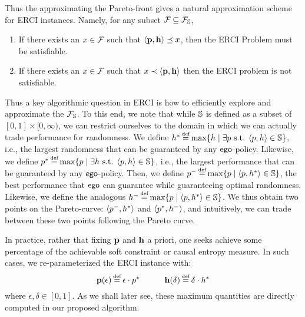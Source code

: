 \noindent
Thus the approximating the Pareto-front gives a natural approximation
scheme for ERCI instances. Namely, for any subset $\mathcal{F}_{} \subseteq
\mathcal{F}_{\mathbb{S}}$,
\begin{enumerate}
\item If there exists an $x \in \mathcal{F}_{}$ such that
$\langle \mathbf{p}, \mathbf{h} \rangle \preceq x$, then the ERCI
Problem must be satisfiable.
\item If there exists an $x \in \mathcal{F}_{}$
such that $x \prec \langle \mathbf{p}, \mathbf{h} \rangle$ then the
ERCI problem is not satisfiable.
\end{enumerate}

\begin{example}
	
\end{example}

Thus a key algorithmic question in ERCI is how to efficiently explore
and approximate the $\mathcal{F}_{\mathbb{S}}$.  
To this end, we note that while $\mathbb{S}$ is defined as a subset of $[0,1] \times [0,\infty)$, we can restrict ourselves to the domain in which we can actually trade performance for randomness. 
We define 
$\rndopt \eqdef \max \{ \rndp \mid \exists \scp \text{ s.t. } \langle \scp, \rndp \rangle \in \solutions  \} $, i.e., the largest randomness that can be guaranteed by any $\mathsf{ego}$-policy. 
Likewise, we define 
$\scopt \eqdef \max \{ \scp \mid \exists \rndp \text{ s.t. } \langle \scp, \rndp \rangle \in \solutions  \} $, i.e., the largest performance that can be guaranteed by any $\mathsf{ego}$-policy. 
Then, we define 
$\scmin \eqdef \max \{ \scp \mid \langle \scp, \rndopt \rangle  \in \solutions \}$, the best performance that $\mathsf{ego}$ can guarantee while guaranteeing optimal randomness. 
Likewise, we define  the analogous $\rndmin \eqdef \max \{ \scp \mid \langle \scp, \rndopt \rangle  \in \solutions \}$.
We thus obtain two points on the Pareto-curve: $\langle p^{-}, h^{*} \rangle$ and $\langle p^{*}, h^{-} \rangle$, and intuitively, we can trade between these two points following the Pareto curve.

\begin{remark}
  In practice, rather that fixing $\mathbf{p}$ and $\mathbf{h}$ a
  priori, one seeks achieve some percentage of the achievable soft
  constraint or causal entropy measure.  In such cases, we
  re-parameterized the ERCI instance with:
  \begin{equation}
    \scthreshold(\epsilon) \eqdef \epsilon \cdot \scopt
    \hspace{3em}
    \randomness(\delta) \eqdef  \delta \cdot \rndopt
  \end{equation}
  where $\epsilon, \delta \in [0, 1]$. As we shall later see, these maximum quantities are
  directly computed in our proposed algorithm.
\end{remark}

